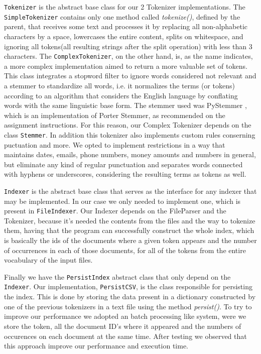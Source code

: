 \documentclass[12pt]{article}
\begin{document}
\newpage
\texttt{Tokenizer} is the abstract base class for our 2 Tokenizer 
implementations.
The \texttt{SimpleTokenizer} contains only one method called 
{\it tokenize()\/}, defined by the parent, that receives some text and processes it by replacing all non-alphabetic 
characters by a space, lowercases the entire content, splits on whitespace, 
and ignoring all tokens(all resulting strings after the split operation) with 
less than 3 characters.
The \texttt{ComplexTokenizer}, on the other hand, is, as the name indicates, a
more complex implementation aimed to return a more valuable set of tokens.
This class integrates a stopword filter to ignore words considered not relevant
and a stemmer to standardize all words, i.e. it normalizes the terms (or tokens)
according to an algorithm that considers the English language by conflating
words with the same linguistic base form.
The stemmer used was PyStemmer \cite{pystemmer}, which is an implementation of 
Porter Stemmer, as recommended on the assignment instructions. 
For this reason, our Complex Tokenizer depends on the class \texttt{Stemmer}.
In addition this tokenizer also implements custom rules conserning puctuation
and more.
We opted to implement restrictions in a way that maintains dates, emails, phone
numbers, money amounts and numbers in general, but eliminate any kind of 
regular punctuation and separates words connected with hyphens or underscores,
considering the resulting terms as tokens as well.

\texttt{Indexer} is the abstract base class that serves as the interface for any indexer that may be implemented. In our case we only needed to implement one, which is present in \texttt{FileIndexer}. Our Indexer depends on the FileParser and the Tokenizer, because it's needed the contents from the files and the way to tokenize them, having that the program can successfully construct the whole index, which is basically the ids of the documents where a given token appears and the number of occurrences in each of those documents, for all of the tokens from the entire
vocabulary of the input files.

Finally we have the \texttt{PersistIndex} abstract class that only depend on the \texttt{Indexer}.
Our implementation, \texttt{PersistCSV}, is the class responsible for persisting the index.
This is done by storing the data present in a dictionary constructed by one of the previous tokenizers in a text file using
the method {\it persist()\/}. To try to improve our performance we adopted an batch processing like system, were we store the token,
all the document ID's where it appeared and the numbers of occurences on each document at the same time. After testing we observed
that this approach improve our performance and execution time.
\end{document}
